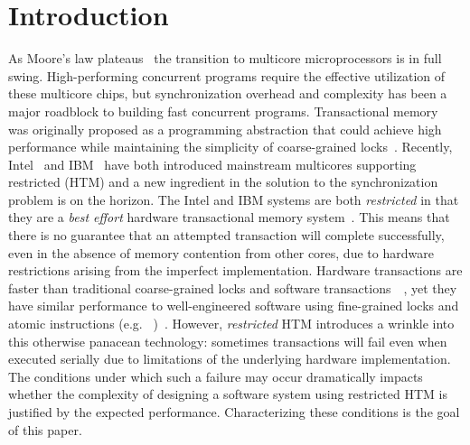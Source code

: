 \section{Introduction}




As Moore's law plateaus~\cite{Vardi14} the transition
to multicore microprocessors is in full swing. High-performing concurrent
programs require the effective utilization of these multicore chips, but 
synchronization overhead and complexity has been a
major roadblock to building fast concurrent programs.
Transactional memory~\cite{HerlihyMo93} was originally
proposed as a programming abstraction that could achieve
high performance while maintaining the simplicity of 
coarse-grained locks~\cite{YooHuLa13}.
Recently, Intel~\cite{Reinders12,IntelISAX12} and
IBM~\cite{CainMiFr13,Merritt11,IBMPower8Overview14} have both
introduced mainstream multicores supporting restricted  (HTM) and a new ingredient in the solution 
to the synchronization problem is on the horizon. The Intel and IBM
systems are both \emph{restricted} in that they are 
a \emph{best effort} hardware transactional memory
system~\cite{Roman12,IntelISAX12,CainMiFr13,IBMPower8Optimization14}.
This means that there is no guarantee that an attempted 
transaction will complete successfully, even in the absence 
of memory contention from other cores, due to hardware restrictions
arising from the imperfect implementation.  
Hardware transactions are faster than traditional
coarse-grained locks and software
transactions~\cite{YooHuLa13}~\cite{CascavalBlMi08}, 
yet they have similar
performance to well-engineered software using fine-grained 
locks and atomic instructions (e.g.
~\cite{Herlihy91})~\cite{YooHuLa13}. 
However, \emph{restricted} HTM introduces a wrinkle into 
this otherwise panacean technology: sometimes transactions
will fail even when executed serially due to limitations
of the underlying hardware implementation.  The conditions
under which such a failure may occur dramatically impacts
whether the complexity of designing a software 
system using restricted HTM
is justified by the expected performance.  Characterizing
these conditions is the goal of this paper. 

